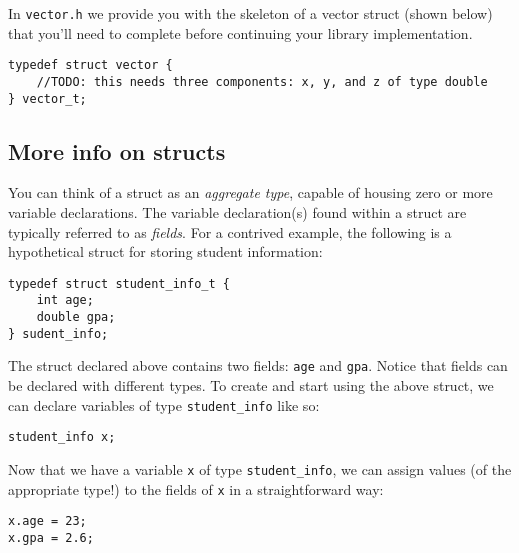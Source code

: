 \documentclass[12pt]{article}
\begin{document}
In \texttt{vector.h} we provide you with the skeleton of a vector struct (shown below) that you'll need to complete before continuing your library implementation.

\begin{mdframed}[backgroundcolor=light-gray, innerleftmargin=10, innertopmargin=1,innerbottommargin=1,linecolor=light-gray]
\begin{lstlisting}
typedef struct vector {
    //TODO: this needs three components: x, y, and z of type double
} vector_t;
\end{lstlisting}
\end{mdframed} 

\subsection{More info on structs}

You can think of a struct as an \textit{aggregate type}, capable of housing zero or more variable declarations. The variable declaration(s) found within a struct are typically referred to as \textit{fields}. For a contrived example, the following is a hypothetical struct for storing student information:

\begin{mdframed}[backgroundcolor=light-gray, innerleftmargin=10, innertopmargin=1,innerbottommargin=1,linecolor=light-gray]
\begin{lstlisting}
typedef struct student_info_t {
    int age;
    double gpa;
} sudent_info;
\end{lstlisting}
\end{mdframed} 

The struct declared above contains two fields: \texttt{age} and \texttt{gpa}. Notice that fields can be  declared with different types. To create and start using the above struct, we can declare variables of type \texttt{student\_info} like so:
\begin{mdframed}[backgroundcolor=light-gray, innerleftmargin=10, innertopmargin=1,innerbottommargin=1,linecolor=light-gray]
\begin{lstlisting}
student_info x;
\end{lstlisting}
\end{mdframed} 
Now that we have a variable \texttt{x} of type \texttt{student\_info}, we can assign values (of the appropriate type!) to the fields of \texttt{x} in a straightforward way:

\begin{mdframed}[backgroundcolor=light-gray, innerleftmargin=10, innertopmargin=1,innerbottommargin=1,linecolor=light-gray]
\begin{lstlisting}
x.age = 23;
x.gpa = 2.6;
\end{lstlisting}
\end{mdframed}
\end{document}
